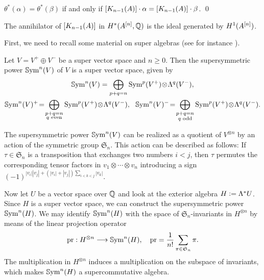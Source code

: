 \begin{corollary} \label{KummerEquality}
$\theta^*(\alpha) = \theta^*(\beta)$ if and only if $[\kum{A}{n-1}]\cdot \alpha = [\kum{A}{n-1}]\cdot \beta$. 
\qed
\end{corollary}

\begin{proposition}\label{Annihideal}
The annihilator of $[\kum{A}{n-1}]$ in $H^*(A\hilb{n},\Q)$ is the ideal generated by $H^1(A\hilb{n})$. 
\end{proposition}
First, we need to recall some material on super algebras (see for instance \cite{DeligneMorgan}).
\begin{definition}
Let $V=V^{+}\oplus V^{-}$ be a super vector space and $n\geq 0$. Then the supersymmetric power $\SSym^n(V)$ of $V$ is a super vector space, given by
\begin{gather*}
\SSym^n(V) = \bigoplus_{p+q=n} \Sym^p(V^{+}) \!\otimes\! \Lambda^q(V^{-}), \\
\SSym^n(V)^{+}\! =\! \bigoplus_{\substack{p+q=n \\ q\text{ even} }} \Sym^p(V^{+}) \!\otimes\! \Lambda^q(V^{-}), \ \ 
\SSym^n(V)^{-}\! =\! \bigoplus_{\substack{p+q=n \\ q\text{ odd} }} \Sym^p(V^{+}) \!\otimes\! \Lambda^q(V^{-}).
\end{gather*}
\end{definition}
\begin{remark}
The supersymmetric power $\SSym^n (V)$ can be realized as a quotient of $V^{\otimes n}$ by an action of the symmetric group $\mathfrak S_n$. This action can be described as follows: If $\tau\in \mathfrak S_n$ is a transposition that exchanges two numbers $i<j$, then $\tau$ permutes the corresponding tensor factors in $v_1\otimes  \cdots\otimes v_n$ introducing a sign
$(-1)^{|v_i||v_j|+(|v_i|+|v_j|)\sum_{i<k<j} |v_k|}$.
\end{remark}

Now let $U$ be a vector space over $\Q$ and look at the exterior algebra $H\defIs  \Lambda^* U$. 
Since $H$ is a super vector space, we can construct the supersymmetric power $ \SSym^n( H)$.
We may identify $\SSym^n( H)$ with the space of $\mathfrak S_n$-invariants in $H^{\otimes n}$ by means of the linear projection operator
$$
\pr : H^{\otimes n} \longrightarrow \SSym^n( H) , \quad \pr = \frac{1}{n!}\sum_{\pi \in\mathfrak S_n} \pi.
$$
The multiplication in $H^{\otimes n}$ induces a multiplication on the subspace of invariants, which makes $\SSym^n( H)$ a supercommutative algebra.

